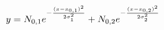 \documentclass{article}
\begin{document}
\begin{equation}
  y=N_{0,1}e^{-\frac{(x-x_{0,1})^2}{2\sigma_1^2}}+N_{0,2}e^{-\frac{(x-x_{0,2})^2}{2\sigma_2^2}}\notag
\end{equation}
\end{document}
